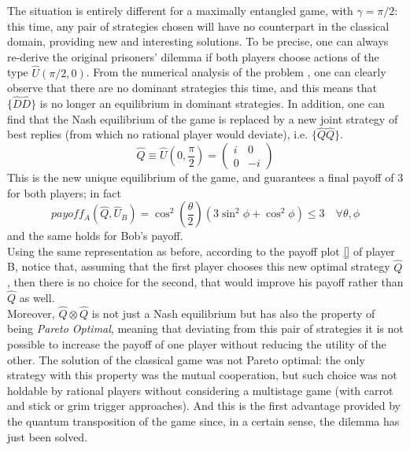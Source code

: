 The situation is entirely different for a maximally entangled game, with $\gamma=\pi/2$: this time, any pair of strategies chosen will have no counterpart in the classical domain, providing new and interesting solutions. To be precise, one can always re-derive the original prisoners' dilemma if both players choose actions of the type $\hat{U}(\pi/2,0)$. From the numerical analysis of the problem \cite{Pujatti_github}, one can clearly observe that there are no dominant strategies this time, and this means that $\{\hat{D}\hat{D}\}$ is no longer an equilibrium in dominant strategies. In addition, one can find that the Nash equilibrium of the game is replaced by a new joint strategy of best replies (from which no rational player would deviate), i.e. $\{\hat{Q}\hat{Q}\}$. 
\[ \hat{Q} \equiv \hat{U}(0,\frac{\pi}{2}) = \begin{pmatrix} i&0\\0&-i \end{pmatrix} \]
This is the new unique equilibrium of the game, and guarantees a final payoff of 3 for both players; in fact
\[ payoff_A(\hat{Q},\hat{U}_B)=\cos^2\left(\frac{\theta}{2}\right)\left(3\sin^2\phi + \cos^2\phi \right)\leq 3 \quad \forall\theta,\phi \]
and the same holds for Bob's payoff.\\
Using the same representation as before, according to the payoff plot \ref{} of player B, notice that, assuming that the first player chooses this new optimal strategy $\hat{Q}$, then there is no choice for the second, that would improve his payoff rather than $\hat{Q}$ as well.\\ 
Moreover, $\hat{Q}\otimes\hat{Q}$ is not just a Nash equilibrium but has also the property of being \textit{Pareto Optimal}, meaning that deviating from this pair of strategies it is not possible to increase the payoff of one player
without reducing the utility of the other. The solution of the classical game was not Pareto optimal: the only strategy with this property was the mutual cooperation, but such choice was not holdable by rational players without considering a multistage game (with carrot and stick or grim trigger approaches). And this is the first advantage provided by the quantum transposition of the game since, in a certain sense, the dilemma has just been solved.\\

